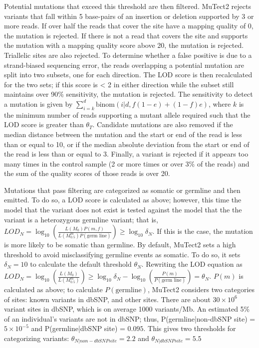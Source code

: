 Potential mutations that exceed this threshold are then filtered. MuTect2 rejects variants that fall within 5 base-pairs of an insertion or deletion supported by 3 or more reads. If over half the reads that cover the site have a mapping quality of 0, the mutation is rejected. If there is not a read that covers the site and supports the mutation with a mapping quality score above 20, the mutation is rejected. Triallelic sites are also rejected. To determine whether a false positive is due to a strand-biased sequencing error, the reads overlapping a potential mutation are split into two subsets, one for each direction. The LOD score is then recalculated for the two sets; if this score is < 2 in either direction while the subset still maintains over 90\% sensitivity, the mutation is rejected. The sensitivity to detect a mutation is given by $\sum_{i=k}^d \text{binom}(i|d,f(1-e)+(1-f)e)$, where $k$ is the minimum number of reads supporting a mutant allele required such that the LOD score is greater than $\theta{}_T$. Candidate mutations are also removed if the median distance between the mutation and the start or end of the read is less than or equal to 10, or if the median absolute deviation from the start or end of the read is less than or equal to 3. Finally, a variant is rejected if it appears too many times in the control sample (2 or more times or over 3\% of the reads) and the sum of the quality scores of those reads is over 20.

Mutations that pass filtering are categorized as somatic or germline and then emitted. To do so, a LOD score is calculated as above; however, this time the model that the variant does not exist is tested against the model that the the variant is a heterozygous germline variant; that is, $LOD_N=\log_{10} \left(\frac{L(M_0)P(m,f)}{L(M_{0.5}^m)P(\text{germ line})}\right) \geq \log_{10} \delta{}_N$. If this is the case, the mutation is more likely to be somatic than germline. By default, MuTect2 sets a high threshold to avoid misclassifying germline events as somatic. To do so, it sets $\delta{}_N = 10$ to calculate the default threshold $\theta{}_N$. Rewriting the LOD equation as $LOD_N = \log_{10} \left(\frac{L(M_0)}{L(M_{0.5}^m)}\right) \geq \log_{10} \delta{}_N - \log_{10} \left(\frac{P(m)}{P(\text{germ line})}\right) = \theta{}_N$. $P(m)$ is calculated as above; to calculate $P(\text{germline})$, MuTect2 considers two categories of sites: known variants in dbSNP, and other sites. There are about $30 \times 10^6$ variant sites in dbSNP, which is on average 1000 variants/Mb. An estimated 5\% of an individual's variants are not in dbSNP; thus, P(germline|non-dbSNP site) = $5 \times 10^{-5}$ and P(germline|dbSNP site) = $0.095$. This gives two thresholds for categorizing variants: $\theta{}_{N|non-dbSNP site} = 2.2$ and $\theta{}_{N|dbSNP site} = 5.5$


